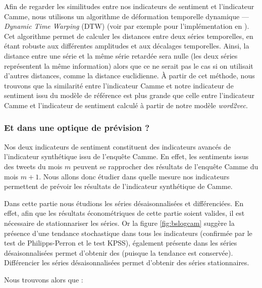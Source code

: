 \documentclass[11pt,french,french]{article}
\begin{document}
Afin de regarder les similitudes entre nos indicateurs de sentiment et l'indicateur Camme, nous utilisons un algorithme de déformation temporelle dynamique --- \emph{Dynamic Time Warping} (DTW) (voir par exemple \cite{dtw} pour l'implémentation en \faRProject).
Cet algorithme permet de calculer les distances entre deux séries temporelles, en étant robuste aux différentes amplitudes et aux décalages temporelles.
Ainsi, la distance entre une série et la même série retardée sera nulle (les deux séries représentent la même information) alors que ce ne serait pas le cas si on utilisait d'autres distances, comme la distance euclidienne.
À partir de cet méthode, nous trouvons que la similarité entre l'indicateur Camme et notre indicateur de sentiment issu du modèle de référence est plus grande que celle entre l'indicateur Camme et l'indicateur de sentiment calculé à partir de notre modèle \emph{word2vec}.

\hypertarget{et-dans-une-optique-de-pruxe9vision}{%
\subsubsection{Et dans une optique de prévision ?}\label{et-dans-une-optique-de-pruxe9vision}}

Nos deux indicateurs de sentiment constituent des indicateurs avancés de l'indicateur synthétique issu de l'enquête Camme.
En effet, les sentiments issus des tweets du mois \(m\) peuvent se rapprocher des résultats de l'enquête Camme du mois \(m+1\).
Nous allons donc étudier dans quelle mesure nos indicateurs permettent de prévoir les résultats de l'indicateur synthétique de Camme.

Dans cette partie nous étudions les séries désaisonnalisées et différenciées.
En effet, afin que les résultats économétriques de cette partie soient valides, il est nécessaire de stationnariser les séries.
Or la figure \ref{fig:bslogcam} suggère la présence d'une tendance stochastique dans tous les indicateurs (confirmée par le test de Philipps-Perron et le test KPSS), également présente dans les séries désaisonnalisées permet d'obtenir des (puisque la tendance est conservée).
Différencier les séries désaisonnalisées permet d'obtenir des séries stationnaires.

Nous trouvons alors que :
\end{document}

